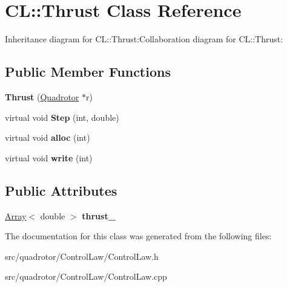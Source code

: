 \hypertarget{classCL_1_1Thrust}{
\section{CL::Thrust Class Reference}
\label{classCL_1_1Thrust}
}
Inheritance diagram for CL::Thrust:Collaboration diagram for CL::Thrust:\subsection*{Public Member Functions}
\begin{DoxyCompactItemize}
\item 
\hypertarget{classCL_1_1Thrust_ab343e53d462e46abc4557aac63e1f2ce}{
{\bfseries Thrust} (\hyperlink{classQuadrotor}{Quadrotor} $\ast$r)}
\label{classCL_1_1Thrust_ab343e53d462e46abc4557aac63e1f2ce}

\item 
\hypertarget{classCL_1_1Thrust_ae30505836a5b53f0611364d9454d8c92}{
virtual void {\bfseries Step} (int, double)}
\label{classCL_1_1Thrust_ae30505836a5b53f0611364d9454d8c92}

\item 
\hypertarget{classCL_1_1Thrust_acf63aa8e59ca8c1e8a0741d4446a0b05}{
virtual void {\bfseries alloc} (int)}
\label{classCL_1_1Thrust_acf63aa8e59ca8c1e8a0741d4446a0b05}

\item 
\hypertarget{classCL_1_1Thrust_a91f80ba432e0e495a6c88613dd34ee2c}{
virtual void {\bfseries write} (int)}
\label{classCL_1_1Thrust_a91f80ba432e0e495a6c88613dd34ee2c}

\end{DoxyCompactItemize}
\subsection*{Public Attributes}
\begin{DoxyCompactItemize}
\item 
\hypertarget{classCL_1_1Thrust_af4783ea1e392716df3866ec1867ee25f}{
\hyperlink{classArray}{Array}$<$ double $>$ {\bfseries thrust\_\-}}
\label{classCL_1_1Thrust_af4783ea1e392716df3866ec1867ee25f}

\end{DoxyCompactItemize}


The documentation for this class was generated from the following files:\begin{DoxyCompactItemize}
\item 
src/quadrotor/ControlLaw/ControlLaw.h\item 
src/quadrotor/ControlLaw/ControlLaw.cpp\end{DoxyCompactItemize}
